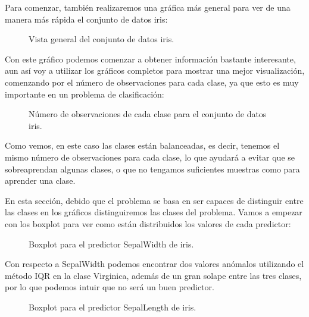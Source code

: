Para comenzar, también realizaremos una gráfica más general para ver de una manera más rápida el conjunto de datos iris:

\begin{figure}[H]
	\centering
	
	\caption{Vista general del conjunto de datos iris.}
	\label{fig:vista_general_iris}
\end{figure}


Con este gráfico podemos comenzar a obtener información bastante interesante, aun así voy a utilizar los gráficos completos para mostrar una mejor visualización, comenzando por el número de observaciones para cada clase, ya que esto es muy importante en un problema de clasificación:

\begin{figure}[H]
	\centering
	
	\caption{Número de observaciones de cada clase para el conjunto de datos iris.}
	\label{fig:recuento_clases_iris}
\end{figure}

Como vemos, en este caso las clases están balanceadas, es decir, tenemos el mismo número de observaciones para cada clase, lo que ayudará a evitar que se sobreaprendan algunas clases, o que no tengamos suficientes muestras como para aprender una clase.

En esta sección, debido que el problema se basa en ser capaces de distinguir entre las clases en los gráficos distinguiremos las clases del problema. Vamos a empezar con los boxplot para ver como están distribuidos los valores de cada predictor:

\begin{figure}[H]
	\centering
	
	\caption{Boxplot para el predictor SepalWidth de iris.}
	\label{fig:boxplot_iris_SepalWidth}
\end{figure}

Con respecto a SepalWidth podemos encontrar dos valores anómalos utilizando el método IQR en la clase Virginica, además de un gran solape entre las tres clases, por lo que podemos intuir que no será un buen predictor.


\begin{figure}[H]
	\centering
	
	\caption{Boxplot para el predictor SepalLength de iris.}
	\label{fig:boxplot_iris_SepalLength}
\end{figure}

